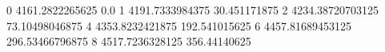 0 4161.2822265625 0.0
1 4191.7333984375 30.451171875
2 4234.38720703125 73.10498046875
4 4353.8232421875 192.541015625
6 4457.81689453125 296.53466796875
8 4517.7236328125 356.44140625
